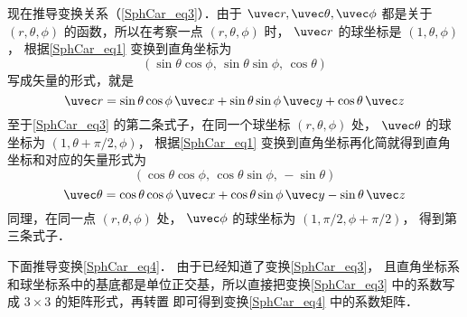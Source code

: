 现在推导变换关系（\autoref{SphCar_eq3}）．由于 $\uvec r,\uvec \theta ,\uvec \phi $ 都是关于 $(r, \theta, \phi)$ 的函数，所以在考察一点 $(r, \theta, \phi)$ 时， $\uvec r$ 的球坐标是 $(1, \theta, \phi)$，  根据\autoref{SphCar_eq1} 变换到直角坐标为
\begin{equation}
(\sin \theta \cos \phi,\,\sin \theta \sin \phi,\,\cos \theta)
\end{equation}
写成矢量的形式，就是
 \begin{equation}
\uvec r = \sin \theta \cos \phi \,\uvec x + \sin \theta \sin \phi \,\uvec y + \cos \theta \,\uvec z
\end{equation}
至于\autoref{SphCar_eq3} 的第二条式子，在同一个球坐标 $(r,\theta ,\phi)$ 处， $\uvec \theta $ 的球坐标为 $(1, \theta + \pi /2, \phi)$， 根据\autoref{SphCar_eq1} 变换到直角坐标再化简就得到直角坐标和对应的矢量形式为
\begin{equation}
(\cos \theta \cos \phi ,\,\cos \theta \sin \phi , \,- \sin \theta)
\end{equation}
\begin{equation}
\uvec \theta  = \cos \theta \cos \phi \,\uvec x + \cos \theta \sin \phi \,\uvec y - \sin \theta \,\uvec z
\end{equation}
同理，在同一点 $(r, \theta, \phi)$ 处， $\uvec \phi $ 的球坐标为 $(1, \pi /2, \phi + \pi /2)$，  得到第三条式子．

下面推导变换\autoref{SphCar_eq4}． 由于已经知道了变换\autoref{SphCar_eq3}， 且直角坐标系和球坐标系中的基底都是单位正交基，所以直接把变换\autoref{SphCar_eq3} 中的系数写成 $3 \times 3$ 的矩阵形式，再转置 %
即可得到变换\autoref{SphCar_eq4} 中的系数矩阵．%

